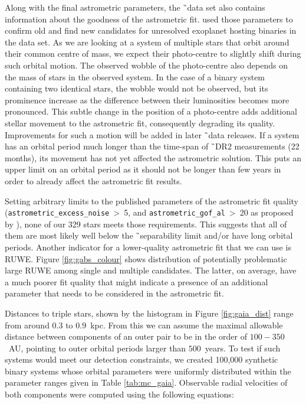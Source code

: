 Along with the final astrometric parameters, the \G\ data set also contains information about the goodness of the astrometric fit. \citet{2018RNAAS...2b..20E} used those parameters to confirm old and find new candidates for unresolved exoplanet hosting binaries in the data set. As we are looking at a system of multiple stars that orbit around their common centre of mass, we expect their photo-centre to slightly shift during such orbital motion. The observed wobble of the photo-centre also depends on the mass of stars in the observed system. In the case of a binary system containing two identical stars, the wobble would not be observed, but its prominence increase as the difference between their luminosities becomes more pronounced. This subtle change in the position of a photo-centre adds additional stellar movement to the astrometric fit, consequently degrading its quality. Improvements for such a motion will be added in later \G\ data releases. If a system has an orbital period much longer than the time-span of \G\ DR2 measurements (22 months), its movement has not yet affected the astrometric solution. This puts an upper limit on an orbital period as it should not be longer than few years in order to already affect the astrometric fit results. 

Setting arbitrary limits to the published parameters of the astrometric fit quality (\texttt{astrometric\_excess\_noise}~>~5, and \texttt{astrometric\_gof\_al}~>~20 as proposed by \citet{2018RNAAS...2b..20E}), none of our 329 stars meets those requirements. This suggests that all of them are most likely well below the \G\ separability limit and/or have long orbital periods. Another indicator for a lower-quality astrometric fit that we can use is RUWE. Figure \ref{fig:gabs_colour} shows distribution of potentially problematic large RUWE among single and multiple candidates. The latter, on average, have a much poorer fit quality that might indicate a presence of an additional parameter that needs to be considered in the astrometric fit. 

Distances to triple stars, shown by the histogram in Figure \ref{fig:gaia_dist} range from around $0.3$ to $0.9$~kpc. From this we can assume the maximal allowable distance between components of an outer pair to be in the order of $100-350$~AU, pointing to outer orbital periods larger than $500$~years. To test if such systems would meet our detection constraints, we created 100,000 synthetic binary systems whose orbital parameters were uniformly distributed within the parameter ranges given in Table \ref{tab:mc_gaia}. Observable radial velocities of both components were computed using the following equations:

